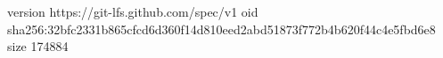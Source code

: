 version https://git-lfs.github.com/spec/v1
oid sha256:32bfc2331b865cfcd6d360f14d810eed2abd51873f772b4b620f44c4e5fbd6e8
size 174884
